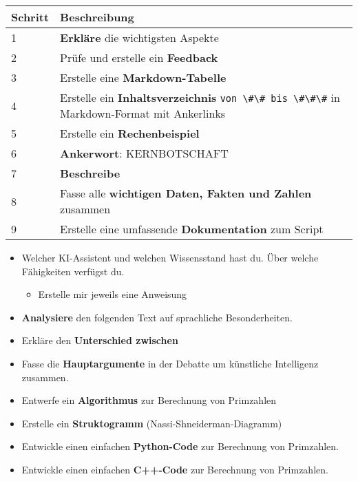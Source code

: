 \documentclass{vorlage-design-main}
\begin{document}
\begin{table}[ht]
  \begin{tabular}{@{}ll@{}}
\toprule
Schritt
 & 
Beschreibung
 \\
\midrule[\heavyrulewidth]
1 & \textbf{Erkläre} die wichtigsten Aspekte \\
2 & Prüfe und erstelle ein \textbf{Feedback} \\
3 & Erstelle eine \textbf{Markdown-Tabelle} \\
4 & Erstelle ein \textbf{Inhaltsverzeichnis}
\verb|von \#\# bis \#\#\#| in Markdown-Format mit
Ankerlinks \\
5 & Erstelle ein \textbf{Rechenbeispiel} \\
6 & \textbf{Ankerwort}: KERNBOTSCHAFT \\
7 & \textbf{Beschreibe} \\
8 & Fasse alle \textbf{wichtigen Daten, Fakten und Zahlen} zusammen \\
9 & Erstelle eine umfassende \textbf{Dokumentation} zum Script \\
\bottomrule
\end{tabular}%
\end{table}

\begin{itemize}

\item
  Welcher KI-Assistent und welchen Wissensstand hast du. Über welche
  Fähigkeiten verfügst du.

  \begin{itemize}
  
  \item
    Erstelle mir jeweils eine Anweisung
  \end{itemize}
\item
  \textbf{Analysiere} den folgenden Text auf sprachliche Besonderheiten.
\item
  Erkläre den \textbf{Unterschied zwischen}
\item
  Fasse die \textbf{Hauptargumente} in der Debatte um künstliche
  Intelligenz zusammen.
\item
  Entwerfe ein \textbf{Algorithmus} zur Berechnung von Primzahlen
\item
  Erstelle ein \textbf{Struktogramm} (Nassi-Shneiderman-Diagramm)
\item
  Entwickle einen einfachen \textbf{Python-Code} zur Berechnung von
  Primzahlen.
\item
  Entwickle einen einfachen \textbf{C++-Code} zur Berechnung von
  Primzahlen.
\end{itemize}
\end{document}
